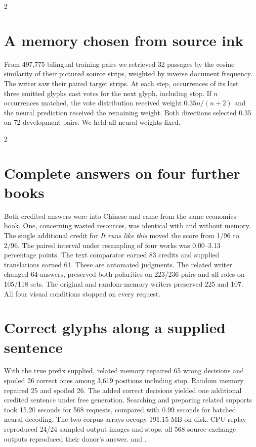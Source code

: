 \begin{multicols}{2}
\section*{A memory chosen from source ink}
From 497,775 bilingual training pairs we retrieved 32 passages by the cosine similarity of their pictured source strips, weighted by inverse document frequency. The writer saw their paired target strips. At each step, occurrences of its last three emitted glyphs cast votes for the next glyph, including stop. If $n$ occurrences matched, the vote distribution received weight $0.35n/(n+2)$ and the neural prediction received the remaining weight. Both directions selected 0.35 on 72 development pairs. We held all neural weights fixed.
\end{multicols}
\begin{multicols}{2}
\section*{Complete answers on four further books}
Both credited answers were into Chinese and came from the same economics book. One, concerning wasted resources, was identical with and without memory. The single additional credit for \emph{It runs like this} moved the score from 1/96 to 2/96. The paired interval under resampling of four works was 0.00--3.13 percentage points. The text comparator earned 83 credits and supplied translations earned 61. These are automated judgments. The related writer changed 64 answers, preserved both polarities on 223/236 pairs and all roles on 105/118 sets. The original and random-memory writers preserved 225 and 107. All four visual conditions stopped on every request.
\section*{Correct glyphs along a supplied sentence}
With the true prefix supplied, related memory repaired 65 wrong decisions and spoiled 26 correct ones among 3,619 positions including stop. Random memory repaired 25 and spoiled 26. The added correct decisions yielded one additional credited sentence under free generation. Searching and preparing related supports took 15.20 seconds for 568 requests, compared with 0.99 seconds for batched neural decoding. The two corpus arrays occupy 191.15 MB on disk. CPU replay reproduced 24/24 sampled output images and stops; all 568 source-exchange outputs reproduced their donor's answer.  and .
\end{multicols}
